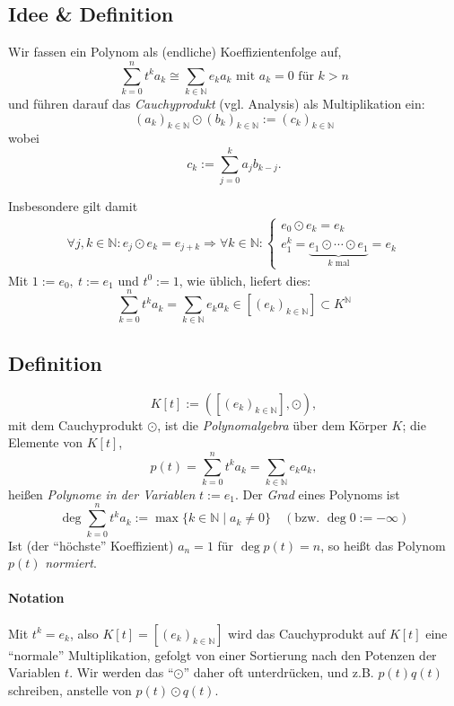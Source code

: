 \subsection{Idee \& Definition} 
	\begin{Definition}[Cauchyprodukt]
		Wir fassen ein Polynom als (endliche) Koeffizientenfolge auf,
		\[ \sum_{k=0}^{n} t^ka_k \cong
		\sum_{k\in \mathbb{N}}e_ka_k \text{ mit } a_k = 0 \text{ für } k>n \]
	und führen darauf das \emph{Cauchyprodukt} (vgl. Analysis) als Multiplikation ein:
		\[ (a_k)_{k\in \mathbb{N}} \odot (b_k)_{k\in \mathbb{N}} := (c_k)_{k\in \mathbb{N}} \]
	wobei
		\[ c_k := \sum_{j=0}^{k}a_jb_{k-j}. \]
	\end{Definition}
	Insbesondere gilt damit
		\begin{gather*}
		\forall j,k\in \mathbb{N}: e_j \odot e_k = e_{j+k}
		\Rightarrow \forall k\in \mathbb{N}:
			\begin{cases}
				e_0 \odot e_k = e_k\\
				e_1^k = \underset{k \text{ mal}}{\underbrace{e_1 \odot \cdots \odot e_1}} = e_k
			\end{cases}
		\end{gather*}
	Mit $ 1:= e_0,\ t:= e_1 $ und $ t^0 := 1 $, wie üblich, liefert dies:
		\[ \sum_{k=0}^{n}t^ka_k = \sum_{k\in \mathbb{N}}e_ka_k \in [(e_k)_{k\in \mathbb{N}}]\subset K^\mathbb{N} \]
\subsection{Definition}
		\begin{Definition}[Polynomalgebra]
			\[ K[t] := ([(e_k)_{k\in \mathbb{N}}],\odot) ,\]
	mit dem Cauchyprodukt $ \odot $, ist die \emph{Polynomalgebra} über dem Körper $ K $; die Elemente von $ K[t] $,
		\[ p(t) = \sum_{k=0}^{n}t^ka_k = \sum_{k\in\mathbb{N}}e_ka_k, \]
	heißen \emph{Polynome in der Variablen} $ t:= e_1 $.
	Der \emph{Grad} eines Polynoms ist
		\[  \deg\sum_{k=0}^{n}t^ka_k := \max \{k\in \mathbb{N}\mid a_k \neq 0\}  \quad \left( \text{bzw. } \deg 0 := -\infty \right) \]
	Ist (der "`höchste"' Koeffizient) $ a_n = 1 $ für $ \deg p(t) = n $, so heißt das Polynom $ p(t) $ \emph{normiert}.
		\end{Definition}
\paragraph{Notation}
	Mit $t^k = e_{k}$, also $ K[t] = [(e_k)_{k\in \mathbb{N}}] $
	wird das Cauchyprodukt auf $ K[t] $ eine "`normale"' Multiplikation, gefolgt von einer Sortierung nach den Potenzen der Variablen $ t $. Wir werden das "`$ \odot $"' daher oft unterdrücken, und z.B. $ p(t)q(t) $ schreiben, anstelle von $ p(t) \odot q(t) $.
